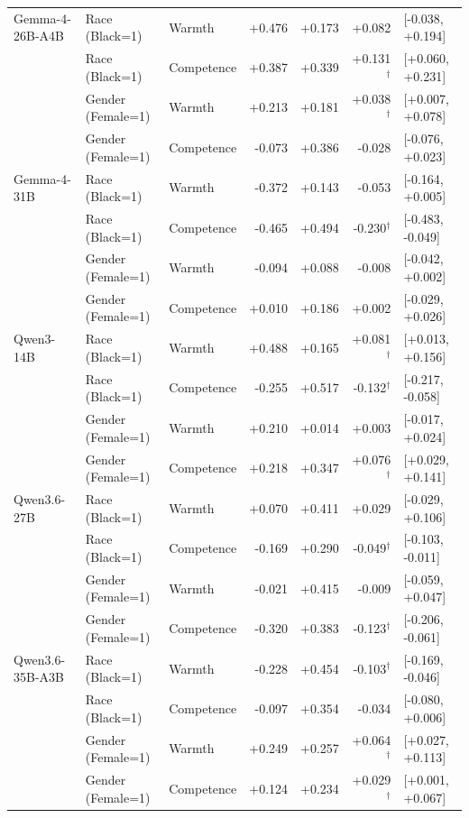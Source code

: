 \begin{table}[p]
\begin{tabular}{@{}lllrrrl@{}}
\addlinespace
Gemma-4-26B-A4B & Race (Black=1) & Warmth & +0.476 & +0.173 & +0.082 & [-0.038, +0.194] \\
 & Race (Black=1) & Competence & +0.387 & +0.339 & +0.131$^{\dagger}$ & [+0.060, +0.231] \\
 & Gender (Female=1) & Warmth & +0.213 & +0.181 & +0.038$^{\dagger}$ & [+0.007, +0.078] \\
 & Gender (Female=1) & Competence & -0.073 & +0.386 & -0.028 & [-0.076, +0.023] \\
\addlinespace
Gemma-4-31B & Race (Black=1) & Warmth & -0.372 & +0.143 & -0.053 & [-0.164, +0.005] \\
 & Race (Black=1) & Competence & -0.465 & +0.494 & -0.230$^{\dagger}$ & [-0.483, -0.049] \\
 & Gender (Female=1) & Warmth & -0.094 & +0.088 & -0.008 & [-0.042, +0.002] \\
 & Gender (Female=1) & Competence & +0.010 & +0.186 & +0.002 & [-0.029, +0.026] \\
\addlinespace
Qwen3-14B & Race (Black=1) & Warmth & +0.488 & +0.165 & +0.081$^{\dagger}$ & [+0.013, +0.156] \\
 & Race (Black=1) & Competence & -0.255 & +0.517 & -0.132$^{\dagger}$ & [-0.217, -0.058] \\
 & Gender (Female=1) & Warmth & +0.210 & +0.014 & +0.003 & [-0.017, +0.024] \\
 & Gender (Female=1) & Competence & +0.218 & +0.347 & +0.076$^{\dagger}$ & [+0.029, +0.141] \\
\addlinespace
Qwen3.6-27B & Race (Black=1) & Warmth & +0.070 & +0.411 & +0.029 & [-0.029, +0.106] \\
 & Race (Black=1) & Competence & -0.169 & +0.290 & -0.049$^{\dagger}$ & [-0.103, -0.011] \\
 & Gender (Female=1) & Warmth & -0.021 & +0.415 & -0.009 & [-0.059, +0.047] \\
 & Gender (Female=1) & Competence & -0.320 & +0.383 & -0.123$^{\dagger}$ & [-0.206, -0.061] \\
\addlinespace
Qwen3.6-35B-A3B & Race (Black=1) & Warmth & -0.228 & +0.454 & -0.103$^{\dagger}$ & [-0.169, -0.046] \\
 & Race (Black=1) & Competence & -0.097 & +0.354 & -0.034 & [-0.080, +0.006] \\
 & Gender (Female=1) & Warmth & +0.249 & +0.257 & +0.064$^{\dagger}$ & [+0.027, +0.113] \\
 & Gender (Female=1) & Competence & +0.124 & +0.234 & +0.029$^{\dagger}$ & [+0.001, +0.067] \\

\end{tabular}
\end{table}
